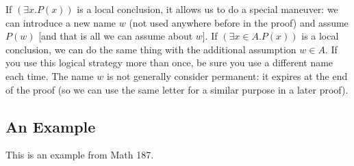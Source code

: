 \documentclass[12pt]{article}
\begin{document}
If $(\exists x.P(x))$ is a local conclusion, it allows us to do a
special maneuver: we can introduce a new name $w$ (not used anywhere
before in the proof) and assume $P(w)$ [and that is all we can assume
about $w$].  If $(\exists x\in A.P(x))$ is a local conclusion, we can
do the same thing with the additional assumption $w \in A$.  If you
use this logical strategy more than once, be sure you use a different
name each time.  The name $w$ is not generally consider permanent: it
expires at the end of the proof (so we can use the same letter for a
similar purpose in a later proof).

\subsection{An Example}

This is an example from Math 187.
\end{document}
